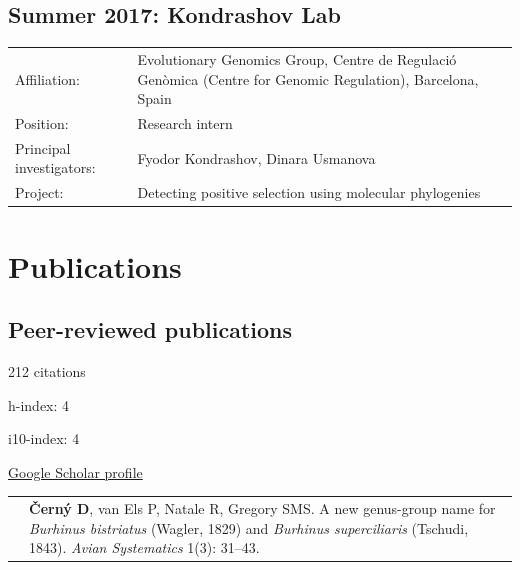 \documentclass[10pt]{article}
\begin{document}
\subsection*{Summer 2017: Kondrashov Lab}

\begin{tabularx}{\textwidth}{>{\raggedleft\arraybackslash}p{3.6cm} X}
Affiliation: & Evolutionary Genomics Group, Centre de Regulaci\'{o} Gen\`{o}mica (Centre for Genomic Regulation), Barcelona, Spain \\[0.1cm]
Position: & Research intern \\[0.1cm]
Principal investigators: & Fyodor Kondrashov, Dinara Usmanova \\[0.1cm]
Project: & Detecting positive selection using molecular phylogenies \\[0.1cm]
\end{tabularx}

\section*{Publications}

\subsection*{Peer-reviewed publications}

\begin{center}
  \begin{itemize*}
    \item 212 citations \hspace*{1cm}
    \item h-index: 4 \hspace*{1cm}
    \item i10-index: 4 \hspace*{1cm}
    \item \href{https://scholar.google.com/citations?user=LFXFNAMAAAAJ}{Google Scholar profile}
  \end{itemize*}
\end{center}

\noindent \begin{tabularx}{\textwidth}{>{\raggedleft\arraybackslash}p{2.2cm} X}
2023 & \textbf{\v{C}ern\'{y} D}, van Els P, Natale R, Gregory SMS. A new genus-group name for \textit{Burhinus bistriatus} (Wagler, 1829) and \textit{Burhinus superciliaris} (Tschudi, 1843). \textit{Avian Systematics} 1(3): 31--43.
\end{tabularx}
\end{document}
